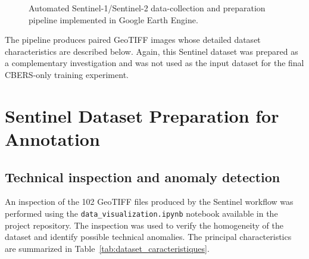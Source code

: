 \documentclass[11pt,a4paper]{article}
\begin{document}
\begin{figure}[H]
\caption{Automated Sentinel-1/Sentinel-2 data-collection and preparation pipeline implemented in Google Earth Engine.}
\label{fig:pipeline_gee}
\end{figure}

The pipeline produces paired GeoTIFF images whose detailed dataset characteristics are described below. Again, this Sentinel dataset was prepared as a complementary investigation and was not used as the input dataset for the final CBERS-only training experiment.

\section{Sentinel Dataset Preparation for Annotation}
\label{sec:sentinel_annotation}

\subsection{Technical inspection and anomaly detection}

An inspection of the 102 GeoTIFF files produced by the Sentinel workflow was performed using the \texttt{data\_visualization.ipynb} notebook available in the project repository. The inspection was used to verify the homogeneity of the dataset and identify possible technical anomalies. The principal characteristics are summarized in Table~\ref{tab:dataset_caracteristiques}.
\end{document}
